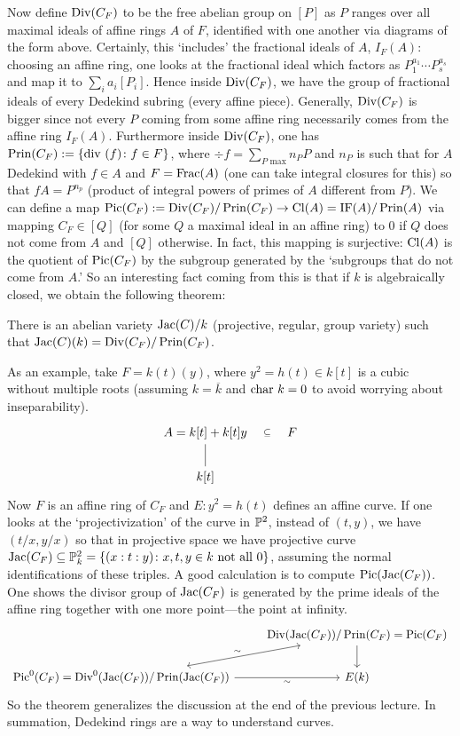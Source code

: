 Now define $\Div(C_F)$ to be the free abelian group on $[P]$ as $P$ ranges over all maximal ideals of affine rings $A$ of $F$, identified with one another via diagrams of the form above. Certainly, this `includes' the fractional ideals of $A$, $I_F(A)$: choosing an affine ring, one looks at the fractional ideal which factors as $P_1^{a_1} \cdots P_s^{a_s}$ and map it to $\sum_i a_i [P_i]$. Hence inside $\Div(C_F)$, we have the group of fractional ideals of every Dedekind subring (every affine piece). Generally, $\Div(C_F)$ is bigger since not every $P$ coming from some affine ring necessarily comes from the affine ring $I_F(A)$. Furthermore inside $\Div(C_F)$, one has $\Prin(C_F):=\{\div(f) \colon f \in F\}$, where $\div f= \sum_{P \text{ max}} n_P P$ and $n_P$ is such that for $A$ Dedekind with $f \in A$ and $F=\Frac(A)$ (one can take integral closures for this) so that $fA=P^{n_p}$ (product of integral powers of primes of $A$ different from $P$). We can define a map $\Pic(C_F):=\Div(C_F)/\Prin(C_F) \to \Cl(A)=\text{IF}(A)/\Prin(A)$ via mapping $C_F \in [Q]$ (for some $Q$ a maximal ideal in an affine ring) to 0 if $Q$ does not come from $A$ and $[Q]$ otherwise. In fact, this mapping is surjective: $\Cl(A)$ is the quotient of $\Pic(C_F)$ by the subgroup generated by the `subgroups that do not come from $A$.' So an interesting fact coming from this is that if $k$ is algebraically closed, we obtain the following theorem:

\begin{thm}
There is an abelian variety $\Jac(C)/k$ (projective, regular, group variety) such that $\Jac(C)(k)=\Div(C_F)/\Prin(C_F)$.
\end{thm}

As an example, take $F=k(t)(y)$, where $y^2=h(t) \in k[t]$ is a cubic without multiple roots (assuming $k=\overline{k}$ and $\char k=0$ to avoid worrying about inseparability). 
	\[
	\begin{tikzcd}
	A=k[t]+k[t]y \arrow[draw=none]{r}[sloped,auto=false]{\subseteq} \arrow[dash]{d} & F \\
	k[t] 
	\end{tikzcd}
	\]
Now $F$ is an affine ring of $C_F$ and $E: y^2=h(t)$ defines an affine curve. If one looks at the `projectivization' of the curve in $\P^2$, instead of $(t,y)$, we have $(t/x,y/x)$ so that in projective space we have projective curve $\Jac(C_F) \subseteq \P^2_k=\{(x:t:y) \colon x,t,y \in k \text{ not all }0\}$, assuming the normal identifications of these triples. A good calculation is to compute $\Pic(\Jac(C_F))$. One shows the divisor group of $\Jac(C_F)$ is generated by the prime ideals of the affine ring together with one more point---the point at infinity. 
	\[
	\begin{tikzcd}
	\phantom{x} & \Div(\Jac(C_F))/\Prin(C_F) = \Pic(C_F) \arrow{d} \\
	\Pic^0(C_F)= \Div^0(\Jac(C_F))/\Prin(\Jac(C_F))  \arrow[leftrightarrow]{ur}{\sim} \arrow[swap]{r}{\sim} & E(k)
	\end{tikzcd}
	\]
So the theorem generalizes the discussion at the end of the previous lecture. In summation, Dedekind rings are a way to understand curves. 


